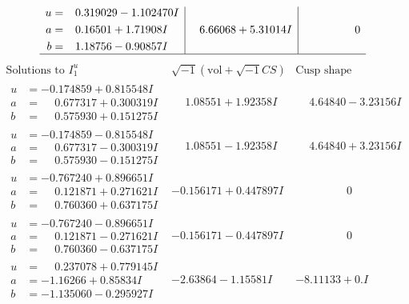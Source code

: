 \documentclass[1p]{elsarticle_modified}
\theoremstyle{definition}
\newcommand{\I}{\sqrt{-1}}
\begin{document}
$$\begin{array}{c|c|c}
\begin{aligned}
u &= \phantom{-}0.319029 - 1.102470 I \\
a &= \phantom{-}0.16501 + 1.71908 I \\
b &= \phantom{-}1.18756 - 0.90857 I\end{aligned}
 & \phantom{-}6.66068 + 5.31014 I & \phantom{-0.000000 } 0\\
 \hline 
 \end{array}$$\newpage$$\begin{array}{c|c|c}  
\text{Solutions to }I^u_{1}& \I (\text{vol} + \sqrt{-1}CS) & \text{Cusp shape}\\
 \hline 
\begin{aligned}
u &= -0.174859 + 0.815548 I \\
a &= \phantom{-}0.677317 + 0.300319 I \\
b &= \phantom{-}0.575930 + 0.151275 I\end{aligned}
 & \phantom{-}1.08551 + 1.92358 I & \phantom{-}4.64840 - 3.23156 I \\ \hline\begin{aligned}
u &= -0.174859 - 0.815548 I \\
a &= \phantom{-}0.677317 - 0.300319 I \\
b &= \phantom{-}0.575930 - 0.151275 I\end{aligned}
 & \phantom{-}1.08551 - 1.92358 I & \phantom{-}4.64840 + 3.23156 I \\ \hline\begin{aligned}
u &= -0.767240 + 0.896651 I \\
a &= \phantom{-}0.121871 + 0.271621 I \\
b &= \phantom{-}0.760360 + 0.637175 I\end{aligned}
 & -0.156171 + 0.447897 I & \phantom{-0.000000 } 0 \\ \hline\begin{aligned}
u &= -0.767240 - 0.896651 I \\
a &= \phantom{-}0.121871 - 0.271621 I \\
b &= \phantom{-}0.760360 - 0.637175 I\end{aligned}
 & -0.156171 - 0.447897 I & \phantom{-0.000000 } 0 \\ \hline\begin{aligned}
u &= \phantom{-}0.237078 + 0.779145 I \\
a &= -1.16266 + 0.85834 I \\
b &= -1.135060 - 0.295927 I\end{aligned}
 & -2.63864 - 1.15581 I & -8.11133 + 0. I\phantom{ +0.000000I} \\ \hline\begin{aligned}

\end{aligned}
\end{array}$$
\end{document}
